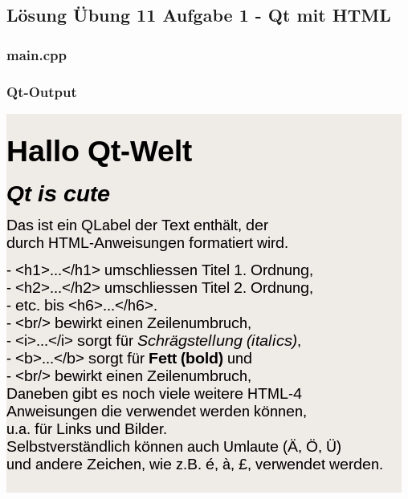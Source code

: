 %

%


%

%

\setcounter{section}{11}
\setcounter{subsection}{1}
%
\newpage
\subsection{Lösung Übung 11 Aufgabe 1 - Qt mit HTML}
\subsubsection{main.cpp}

\subsubsection{Qt-Output}
\begin{center}
	\includegraphics[scale=.5]{./images/u11a1.png}
\end{center}

